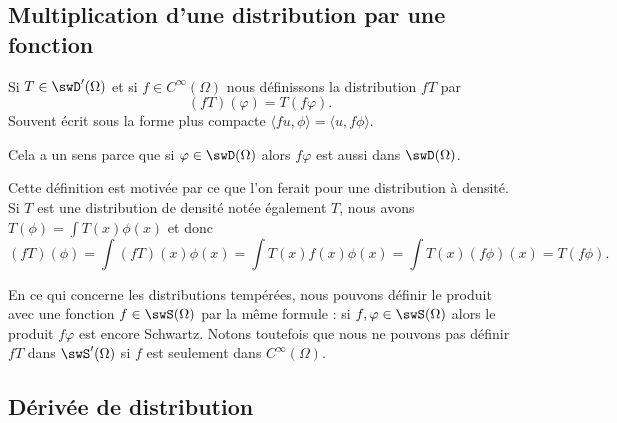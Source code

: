 \subsection{Multiplication d'une distribution par une fonction}

\begin{definition}  \label{DefZVRNooDXAoTU}
	Si \( T\in\swD'(\Omega)\) et si \( f\in  C^{\infty}(\Omega)\) nous définissons la distribution \( fT\) par
	\begin{equation}    \label{DefTDkrqkA}
		(fT)(\varphi)=T(f\varphi).
	\end{equation}
	Souvent écrit sous la forme plus compacte \( \langle fu, \phi\rangle =\langle u, f\phi\rangle \).
\end{definition}
Cela a un sens parce que si \( \varphi\in\swD(\Omega)\) alors \( f\varphi\) est aussi dans \( \swD(\Omega)\).

Cette définition est motivée par ce que l'on ferait pour une distribution à densité. Si \( T\) est une distribution de densité notée également \( T\), nous avons \( T(\phi)=\int T(x)\phi(x)\) et donc
\begin{equation}
	(fT)(\phi)=\int (fT)(x)\phi(x)=\int T(x)f(x)\phi(x)=\int T(x)(f\phi)(x)=T(f\phi).
\end{equation}

En ce qui concerne les distributions tempérées, nous pouvons définir le produit avec une fonction \( f\in\swS(\Omega)\) par la même formule : si \( f,\varphi\in\swS(\Omega)\) alors le produit \( f\varphi\) est encore Schwartz. Notons toutefois que nous ne pouvons pas définir \( fT\) dans \( \swS'(\Omega)\) si \( f\) est seulement dans \(  C^{\infty}(\Omega)\).

\subsection{Dérivée de distribution}

